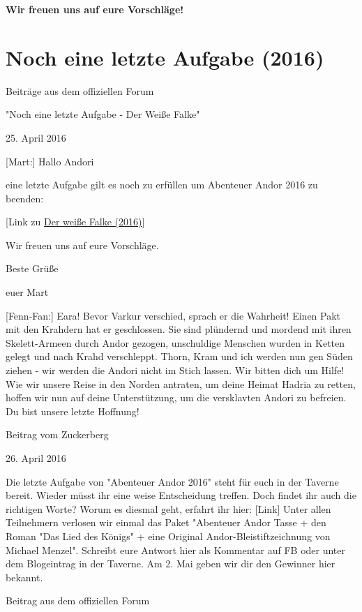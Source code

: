 \documentclass[10pt, a4paper, oneside]{book}
\newcommand{\fillbreak}{\vspace*{\fill}\columnbreak}
\newcommand{\storytext}[1]{%
    \section{#1}%
    \label{Storytext: #1}%
}
\newcommand{\refstorytext}[1]{\hyperref[Storytext: #1]{#1}}
\begin{document}
\begin{multicols}{2}
\textbf{Wir freuen uns auf eure Vorschläge!}




\fillbreak
\storytext{Noch eine letzte Aufgabe (2016)}

\begin{center}
    Beiträge aus dem offiziellen Forum

    "Noch eine letzte Aufgabe - Der Weiße Falke"

    25. April 2016
\end{center}



[Mart:] Hallo Andori

eine letzte Aufgabe gilt es noch zu erfüllen um Abenteuer Andor 2016 zu beenden:

[Link zu \refstorytext{Der weiße Falke (2016)}]

Wir freuen uns auf eure Vorschläge.

Beste Grüße

euer Mart

[Fenn-Fan:] Eara! Bevor Varkur verschied, sprach er die Wahrheit! Einen Pakt mit den Krahdern hat er geschlossen. Sie sind plündernd und mordend mit ihren Skelett-Armeen durch Andor gezogen, unschuldige Menschen wurden in Ketten gelegt und nach Krahd verschleppt. Thorn, Kram und ich werden nun gen Süden ziehen - wir werden die Andori nicht im Stich lassen. Wir bitten dich um Hilfe! Wie wir unsere Reise in den Norden antraten, um deine Heimat Hadria zu retten, hoffen wir nun auf deine Unterstützung, um die versklavten Andori zu befreien. Du bist unsere letzte Hoffnung!

\begin{center}
    Beitrag vom Zuckerberg

    26. April 2016
\end{center}


Die letzte Aufgabe von "Abenteuer Andor 2016" steht für euch in der Taverne bereit. Wieder müsst ihr eine weise Entscheidung treffen. Doch findet ihr auch die richtigen Worte? Worum es diesmal geht, erfahrt ihr hier: [Link] Unter allen Teilnehmern verlosen wir einmal das Paket "Abenteuer Andor Tasse + den Roman "Das Lied des Königs" + eine Original Andor-Bleistiftzeichnung von Michael Menzel". Schreibt eure Antwort hier als Kommentar auf FB oder unter dem Blogeintrag in der Taverne. Am 2. Mai geben wir dir den Gewinner hier bekannt.

\begin{center}
    Beitrag aus dem offiziellen Forum


\end{center}
\end{multicols}
\end{document}
